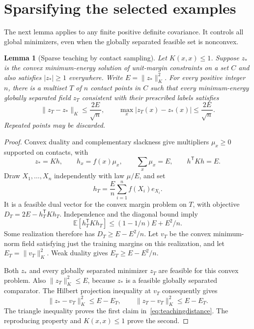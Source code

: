 \documentclass[11pt,a4paper]{article}
\newtheorem{lemma}[theorem]{Lemma}
\theoremstyle{remark}\newtheorem{remark}[theorem]{Remark}
\newcommand{\E}{\mathbb E}\newcommand{\Pp}{\mathbb P}
\newcommand{\normK}[1]{\lVert #1\rVert_K}
\begin{document}
\section{Sparsifying the selected examples}
The next lemma applies to any finite positive definite covariance. It
controls all global minimizers, even when the globally separated feasible
set is nonconvex.

\begin{lemma}[Sparse teaching by contact sampling]\label{lem:teaching}
Let $K(x,x)\le1$. Suppose $z_*$ is the convex minimum-energy solution of
unit-margin constraints on a set $C$ and also satisfies $|z_*|\ge1$
everywhere. Write $E=\normK{z_*}^2$. For every positive integer $n$,
there is a multiset $T$ of $n$ contact points in $C$ such that every
minimum-energy globally separated field $z_T$ consistent with their
prescribed labels satisfies
\begin{equation}\label{eq:teachingdistance}
 \normK{z_T-z_*}\le\frac{2E}{\sqrt n},\qquad
 \max_x|z_T(x)-z_*(x)|\le\frac{2E}{\sqrt n}.
\end{equation}
Repeated points may be discarded.
\end{lemma}
\begin{proof}
Convex duality and complementary slackness give multipliers $\mu_x\ge0$
supported on contacts, with
\[
 z_*=Kh,\qquad h_x=f(x)\mu_x,\qquad
 \sum_x\mu_x=E,\qquad h^{\mathsf T}Kh=E.
\]
Draw $X_1,\ldots,X_n$ independently with law $\mu/E$, and set
\[
 h_T=\frac En\sum_{i=1}^nf(X_i)e_{X_i}.
\]
It is a feasible dual vector for the convex margin problem on $T$, with
objective $D_T=2E-h_T^{\mathsf T}Kh_T$. Independence and the diagonal
bound imply
\[
 \E[h_T^{\mathsf T}Kh_T]\le(1-1/n)E+E^2/n.
\]
Some realization therefore has $D_T\ge E-E^2/n$. Let $v_T$ be the
convex minimum-norm field satisfying just the training margins on this
realization, and let $E_T=\normK{v_T}^2$. Weak duality gives
$E_T\ge E-E^2/n$.

Both $z_*$ and every globally separated minimizer $z_T$ are feasible for
this convex problem. Also $\normK{z_T}^2\le E$, because $z_*$ is a
feasible globally separated comparator. The Hilbert projection inequality
at $v_T$ consequently gives
\[
 \normK{z_*-v_T}^2\le E-E_T,\qquad
 \normK{z_T-v_T}^2\le E-E_T.
\]
The triangle inequality proves the first claim in~\eqref{eq:teachingdistance}.
The reproducing property and $K(x,x)\le1$ prove the second.
\end{proof}
\end{document}
